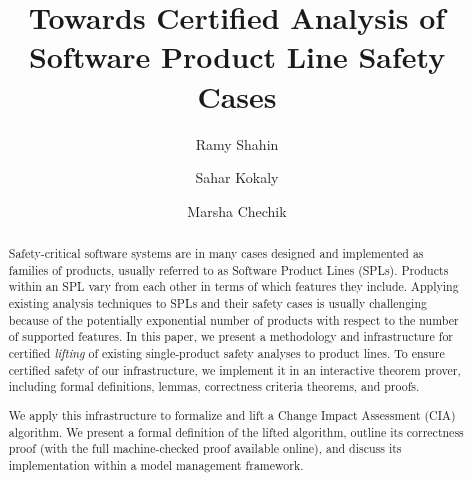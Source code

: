 \documentclass[runningheads]{llncs}
\begin{document}

\title{Towards Certified Analysis of Software Product Line Safety Cases}
\author{Ramy Shahin \and
	Sahar Kokaly \and
	Marsha Chechik}
\maketitle

\vspace{-0.2in}
\begin{abstract}
	Safety-critical software systems are in many cases designed and implemented as families of products, usually referred to as Software Product Lines (SPLs). Products within an SPL vary from each other in terms of which features they include. Applying existing analysis techniques to SPLs and their safety cases is usually challenging because of the potentially exponential number of products with respect to the number of supported features.
	In this paper, we present a methodology and infrastructure for certified \emph{lifting} of existing single-product safety analyses to product lines. To ensure certified safety of our infrastructure, we implement it in an interactive theorem prover, including formal definitions, lemmas, correctness criteria theorems, and proofs.
	
	We apply this infrastructure to formalize and lift a Change Impact Assessment (CIA) algorithm. We present a formal definition of the lifted algorithm, outline its correctness proof (with the full machine-checked proof available online), and discuss its implementation within a model management framework. 
\end{abstract}
\vspace{-0.2in}











\end{document}
